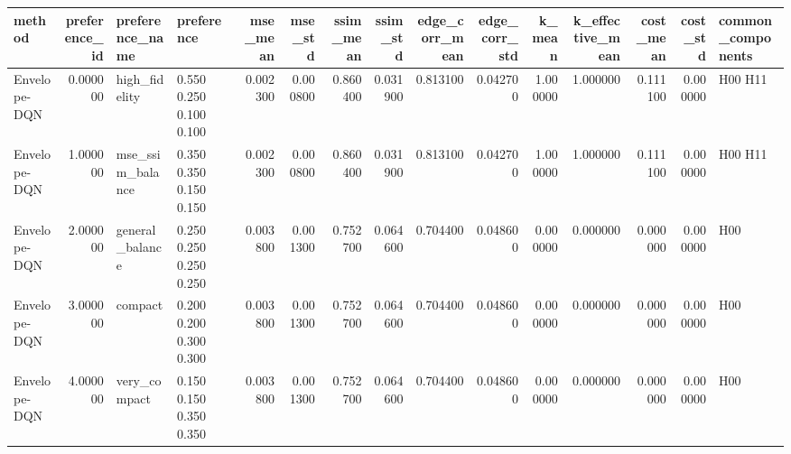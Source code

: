 \begin{tabular}{lrllrrrrrrrrrrl}
\toprule
method & preference_id & preference_name & preference & mse_mean & mse_std & ssim_mean & ssim_std & edge_corr_mean & edge_corr_std & k_mean & k_effective_mean & cost_mean & cost_std & common_components \\
\midrule
Envelope-DQN & 0.000000 & high_fidelity & 0.550 0.250 0.100 0.100 & 0.002300 & 0.000800 & 0.860400 & 0.031900 & 0.813100 & 0.042700 & 1.000000 & 1.000000 & 0.111100 & 0.000000 & H00 H11 \\
Envelope-DQN & 1.000000 & mse_ssim_balance & 0.350 0.350 0.150 0.150 & 0.002300 & 0.000800 & 0.860400 & 0.031900 & 0.813100 & 0.042700 & 1.000000 & 1.000000 & 0.111100 & 0.000000 & H00 H11 \\
Envelope-DQN & 2.000000 & general_balance & 0.250 0.250 0.250 0.250 & 0.003800 & 0.001300 & 0.752700 & 0.064600 & 0.704400 & 0.048600 & 0.000000 & 0.000000 & 0.000000 & 0.000000 & H00 \\
Envelope-DQN & 3.000000 & compact & 0.200 0.200 0.300 0.300 & 0.003800 & 0.001300 & 0.752700 & 0.064600 & 0.704400 & 0.048600 & 0.000000 & 0.000000 & 0.000000 & 0.000000 & H00 \\
Envelope-DQN & 4.000000 & very_compact & 0.150 0.150 0.350 0.350 & 0.003800 & 0.001300 & 0.752700 & 0.064600 & 0.704400 & 0.048600 & 0.000000 & 0.000000 & 0.000000 & 0.000000 & H00 \\
\bottomrule
\end{tabular}
